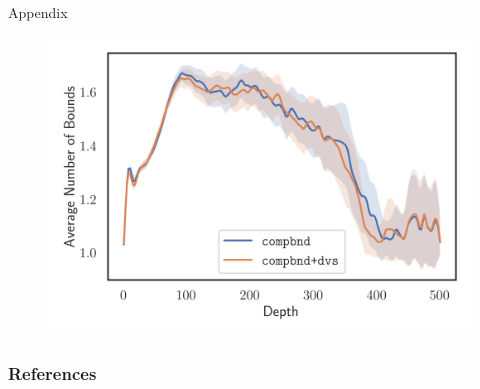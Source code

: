 \documentclass[compress,beamer,aspectratio=169,english,usenames,dvipsnames]{beamer}
\begin{document}
\begin{frame}
\frametitle{}
\huge Appendix
\centering
\begin{figure}
\includegraphics[height=0.85\textheight]{graphics/slides/bound_stats/compbnd/avg_num_bounds_vs_depth.png}
\end{figure}
\end{frame}

\begin{frame}[allowframebreaks]
\frametitle{References}
\printbibliography[heading=none]
\end{frame}
\end{document}
